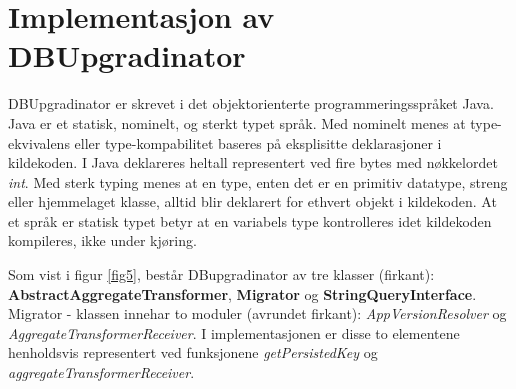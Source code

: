 \section{Implementasjon av DBUpgradinator}

DBUpgradinator er skrevet i det objektorienterte programmeringsspråket Java. Java er et statisk, nominelt, og sterkt typet språk. Med nominelt menes at type-ekvivalens eller type-kompabilitet baseres på eksplisitte deklarasjoner i kildekoden. I Java deklareres heltall representert ved fire bytes med nøkkelordet \emph{int}. Med sterk typing menes at en type, enten det er en primitiv datatype, streng eller hjemmelaget klasse, alltid blir deklarert for ethvert objekt i kildekoden. At et språk er statisk typet betyr at en variabels type kontrolleres idet kildekoden kompileres, ikke under kjøring.


Som vist i figur \ref{fig5}, består DBupgradinator av tre klasser (firkant): \textbf{AbstractAggregateTransformer}, \textbf{Migrator} og \textbf{StringQueryInterface}. Migrator - klassen innehar to moduler (avrundet firkant): \emph{AppVersionResolver} og \emph{AggregateTransformerReceiver}. I implementasjonen er disse to elementene henholdsvis representert ved funksjonene \emph{getPersistedKey} og \emph{aggregateTransformerReceiver}.


